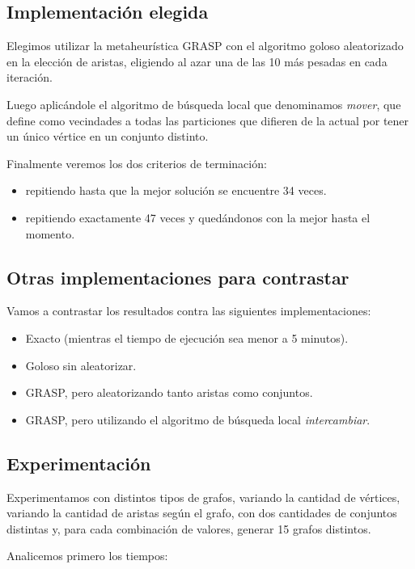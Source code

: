 \subsection{Implementación elegida}

Elegimos utilizar la metaheurística GRASP con el algoritmo goloso aleatorizado
en la elección de aristas, eligiendo al azar una de las 10 más pesadas en cada
iteración.

Luego aplicándole el algoritmo de búsqueda local que denominamos \textit{mover}, que
define como vecindades a todas las particiones que difieren de la actual por
tener un único vértice en un conjunto distinto.

Finalmente veremos los dos criterios de terminación:
\begin{itemize}
  \item repitiendo hasta que la mejor solución se encuentre 34 veces.
  \item repitiendo exactamente 47 veces y quedándonos con la mejor hasta el momento.
\end{itemize}

\subsection{Otras implementaciones para contrastar}

Vamos a contrastar los resultados contra las siguientes implementaciones:

\begin{itemize}
  \item Exacto (mientras el tiempo de ejecución sea menor a 5 minutos).
  \item Goloso sin aleatorizar.
  \item GRASP, pero aleatorizando tanto aristas como conjuntos.
  \item GRASP, pero utilizando el algoritmo de búsqueda local
  \textit{intercambiar}.
\end{itemize}

\subsection{Experimentación}

Experimentamos con distintos tipos de grafos, variando la cantidad de vértices,
variando la cantidad de aristas según el grafo, con dos cantidades de conjuntos
distintas y, para cada combinación de valores, generar 15 grafos distintos.

Analicemos primero los tiempos:

